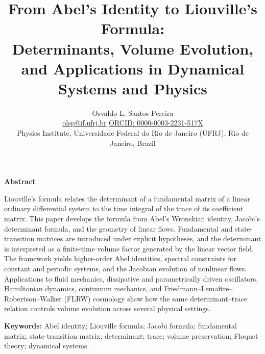 \documentclass[11pt,a4paper]{article}
\title{From Abel's Identity to Liouville's Formula:\\
Determinants, Volume Evolution, and Applications in Dynamical Systems and Physics}
\author{Osvaldo L. Santos-Pereira\\[0.15em]
\small\href{mailto:olsp@if.ufrj.br}{olsp@if.ufrj.br}\quad\textbullet\quad
\href{https://orcid.org/0000-0003-2231-517X}{ORCID: 0000-0003-2231-517X}\\[0.15em]
\small Physics Institute, Universidade Federal do Rio de Janeiro (UFRJ), Rio de Janeiro, Brazil}
\date{}
\theoremstyle{definition}
\numberwithin{equation}{section}
\renewenvironment{abstract}{%
  \small
  \begin{center}\bfseries Abstract\end{center}%
  \vspace{-0.55em}\noindent
}{\par\vspace{0.25em}}
\begin{document}
\maketitle

\begin{abstract}
Liouville's formula relates the determinant of a fundamental matrix of a linear ordinary differential system to the time integral of the trace of its coefficient matrix. This paper develops the formula from Abel's Wronskian identity, Jacobi's determinant formula, and the geometry of linear flows. Fundamental and state-transition matrices are introduced under explicit hypotheses, and the determinant is interpreted as a finite-time volume factor generated by the linear vector field. The framework yields higher-order Abel identities, spectral constraints for constant and periodic systems, and the Jacobian evolution of nonlinear flows. Applications to fluid mechanics, dissipative and parametrically driven oscillators, Hamiltonian dynamics, continuum mechanics, and Friedmann--Lema\^itre--Robertson--Walker (FLRW) cosmology show how the same determinant--trace relation controls volume evolution across several physical settings.
\end{abstract}
{\small\noindent\textbf{Keywords:} Abel identity; Liouville formula; Jacobi formula; fundamental matrix; state-transition matrix; determinant; trace; volume preservation; Floquet theory; dynamical systems.\par}
\vspace{0.35em}
\end{document}
